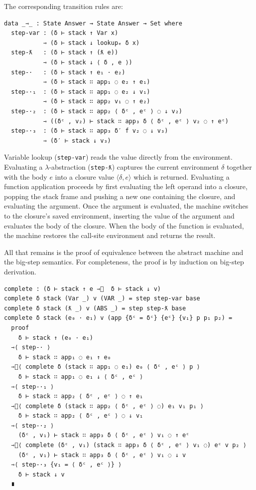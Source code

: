 The corresponding transition rules are:

\begin{verbatim}
data _⇾_ : State Answer → State Answer → Set where
  step-var : (δ ⊢ stack ↑ Var x)
           ⇾ (δ ⊢ stack ↓ lookupₑ δ x)
  step-ƛ   : (δ ⊢ stack ↑ (ƛ e))
           ⇾ (δ ⊢ stack ↓ ⟨ δ , e ⟩)
  step-·   : (δ ⊢ stack ↑ e₁ · e₂)
           ⇾ (δ ⊢ stack ∷ app₁ ◌ e₂ ↑ e₁)
  step-·₁  : (δ ⊢ stack ∷ app₁ ◌ e₂ ↓ v₁)
           ⇾ (δ ⊢ stack ∷ app₂ v₁ ◌ ↑ e₂)
  step-·₂  : (δ ⊢ stack ∷ app₂ ⟨ δᶜ , eᶜ ⟩ ◌ ↓ v₂)
           ⇾ ((δᶜ , v₂) ⊢ stack ∷ app₃ δ ⟨ δᶜ , eᶜ ⟩ v₂ ◌ ↑ eᶜ)
  step-·₃  : (δ ⊢ stack ∷ app₃ δ′ f v₂ ◌ ↓ v₃)
           ⇾ (δ′ ⊢ stack ↓ v₃)
\end{verbatim}

Variable lookup (\texttt{step-var}) reads the value directly from the environment.
Evaluating a $\lambda$-abstraction (\texttt{step-ƛ}) captures the current environment $\delta$ together with the body $e$ into a closure value $\langle\delta, e\rangle$ which is returned.
Evaluating a function application proceeds by first evaluating the left operand into a closure, popping the stack frame and pushing a new one containing the closure, and evaluating the argument. 
Once the argument is evaluated, the machine switches to the closure's saved environment, inserting the value of the argument and evaluates the body of the closure.
When the body of the function is evaluated, the machine restores the call-site environment and returns the result.

All that remains is the proof of equivalence between the abstract machine and the big-step semantics.
For completeness, the proof is by induction on big-step derivation.

\begin{verbatim}
complete : (δ ⊢ stack ↑ e ⇾⃰  δ ⊢ stack ↓ v)
complete δ stack (Var _) v (VAR _) = step step-var base
complete δ stack (ƛ _) v (ABS _) = step step-ƛ base
complete δ stack (e₀ · e₁) v (app {δᶜ = δᶜ} {eᶜ} {v₁} p p₁ p₂) =
  proof
    δ ⊢ stack ↑ (e₀ · e₁)
  ⇾⟨ step-· ⟩
    δ ⊢ stack ∷ app₁ ◌ e₁ ↑ e₀
  ⇾⃰⟨ complete δ (stack ∷ app₁ ◌ e₁) e₀ ⟨ δᶜ , eᶜ ⟩ p ⟩
    δ ⊢ stack ∷ app₁ ◌ e₁ ↓ ⟨ δᶜ , eᶜ ⟩
  ⇾⟨ step-·₁ ⟩
    δ ⊢ stack ∷ app₂ ⟨ δᶜ , eᶜ ⟩ ◌ ↑ e₁
  ⇾⃰⟨ complete δ (stack ∷ app₂ ⟨ δᶜ , eᶜ ⟩ ◌) e₁ v₁ p₁ ⟩
    δ ⊢ stack ∷ app₂ ⟨ δᶜ , eᶜ ⟩ ◌ ↓ v₁
  ⇾⟨ step-·₂ ⟩
    (δᶜ , v₁) ⊢ stack ∷ app₃ δ ⟨ δᶜ , eᶜ ⟩ v₁ ◌ ↑ eᶜ
  ⇾⃰⟨ complete (δᶜ , v₁) (stack ∷ app₃ δ ⟨ δᶜ , eᶜ ⟩ v₁ ◌) eᶜ v p₂ ⟩
    (δᶜ , v₁) ⊢ stack ∷ app₃ δ ⟨ δᶜ , eᶜ ⟩ v₁ ◌ ↓ v
  ⇾⟨ step-·₃ {v₁ = ⟨ δᶜ , eᶜ ⟩} ⟩
    δ ⊢ stack ↓ v
  ∎
\end{verbatim}


